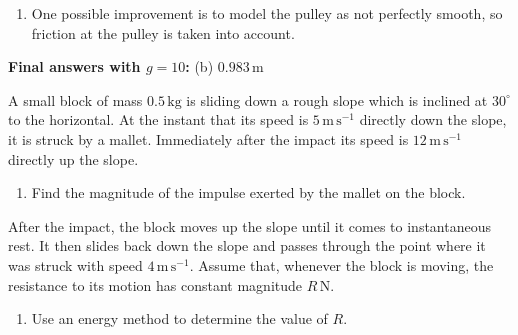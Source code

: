 \documentclass[leqno]{article}
\begin{document}
\begin{enumerate}[
  label=\textbf{\arabic*.},
  leftmargin=*,
  topsep=0pt,
  partopsep=0pt,
  parsep=0pt
]
\begin{djsSolution}
\begin{enumerate}[label=\textbf{(\alph*)}]
  Hence
  \[
  d=\frac{22.05}{g(3\sqrt2-2)}
  \]

  With $g=9.8$:
  \begin{align*}
  d&=\frac{22.05}{9.8(3\sqrt2-2)} \\
  &=\frac{9}{4(3\sqrt2-2)} \\
  &=\frac{9(3\sqrt2+2)}{56} \\
  &\approx 1.00
  \end{align*}

  So
  \[
  d\approx 1.00\,\mathrm{m}
  \]

  \item One possible improvement is to model the pulley as not perfectly smooth, so friction at the pulley is taken into account.
\end{enumerate}
\par\medskip\noindent\textbf{Final answers with \(g = 10\):} (b) \(0.983\,\mathrm{m}\)
\end{djsSolution}


\newpage

\questionitem

A small block of mass $0.5\,\mathrm{kg}$ is sliding down a rough slope which is inclined at $30^\circ$ to the horizontal. At the instant that its speed is $5\,\mathrm{m\,s^{-1}}$ directly down the slope, it is struck by a mallet. Immediately after the impact its speed is $12\,\mathrm{m\,s^{-1}}$ directly up the slope. \\

\begin{enumerate}[label=\textbf{(\alph*)}]
  \item Find the magnitude of the impulse exerted by the mallet on the block.  \\
\end{enumerate}

After the impact, the block moves up the slope until it comes to instantaneous rest. It then slides back down the slope and passes through the point where it was struck with speed $4\,\mathrm{m\,s^{-1}}$. Assume that, whenever the block is moving, the resistance to its motion has constant magnitude $R\,\mathrm{N}$. \\

\begin{enumerate}[label=\textbf{(\alph*)}, resume]
  \item Use an energy method to determine the value of $R$.  \\
\end{enumerate}


\end{enumerate}
\end{document}
